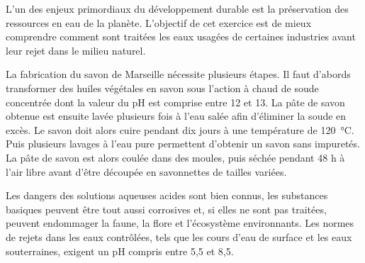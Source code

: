 
\medskip
L'un des enjeux primordiaux du développement durable est la préservation des ressources en eau de la planète.
L'objectif de cet exercice est de mieux comprendre comment sont traitées les eaux usagées de certaines industries avant leur rejet dans le milieu naturel.

\medskip
La fabrication du savon de Marseille nécessite plusieurs étapes.
Il faut d'abords transformer des huiles végétales en savon sous l'action à chaud de soude concentrée dont la valeur du pH est comprise entre 12 et 13.
La pâte de savon obtenue est ensuite lavée plusieurs fois à l'eau salée afin d'éliminer la soude en excès.
Le savon doit alors cuire pendant dix jours à une température de \qty{120}{\degreeCelsius}.
Puis plusieurs lavages à l'eau pure permettent d'obtenir un savon sans impuretés.
La pâte de savon est alors coulée dans des moules, puis séchée pendant 48 h à l'air libre avant d'être découpée en savonnettes de tailles variées.

\medskip
Les dangers des solutions aqueuses acides sont bien connus, les substances basiques peuvent être tout aussi corrosives et, si elles ne sont pas traitées, peuvent endommager la faune, la flore et l'écosystème environnants.
Les normes de rejets dans les eaux contrôlées, tels que les cours d'eau de surface et les eaux souterraines, exigent un pH compris entre 5,5 et 8,5.



\medskip
\begin{boite}
\end{boite}

